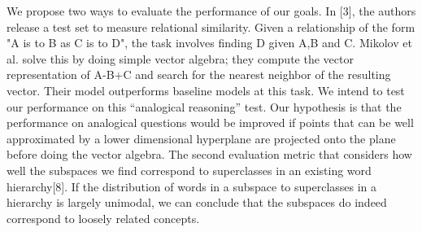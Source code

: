 We propose two ways to evaluate the performance of our goals. 
In [3], the authors release a test set to measure relational similarity. 
Given a relationship of the form "A is to B as C is to D", the task involves finding D given A,B and C. 
Mikolov et al. 
solve this by doing simple vector algebra; they compute the vector representation of A-B+C and search for the nearest neighbor of the resulting vector. 
Their model outperforms baseline models at this task. 
We intend to test our performance on this “analogical reasoning” test. 
Our hypothesis is that the performance on analogical questions would be improved if points that can be well approximated by a lower dimensional hyperplane are projected onto the plane before doing the vector algebra. 
The second evaluation metric that considers how well the subspaces we find correspond to superclasses in an existing word hierarchy[8]. 
If the distribution of words in a subspace to superclasses in a hierarchy is largely unimodal, we can conclude that the subspaces do indeed correspond to loosely related concepts. 
